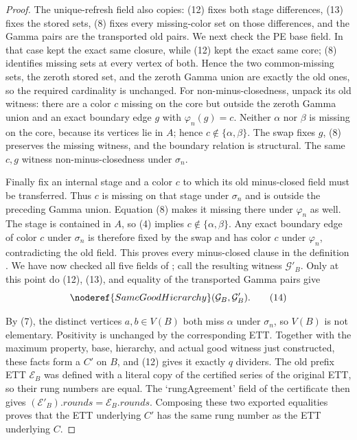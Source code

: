 \begin{proof}
The unique-refresh field also copies: (12) fixes both stage differences,
(13) fixes the stored sets, (8) fixes every missing-color set on those
differences, and the Gamma pairs are the transported old pairs.  We next
check the PE base field.  In that case
 kept the exact same closure,
while (12) kept the exact same core; (8) identifies missing sets at every
vertex of both.  Hence
the two common-missing sets, the zeroth stored set, and the zeroth Gamma
union are exactly the old ones, so the required cardinality is unchanged.
For non-minus-closedness, unpack its old witness: there are a color $c$
missing on the core but outside the zeroth Gamma union and an exact
boundary edge $g$ with $\varphi_n(g)=c$.  Neither $\alpha$ nor $\beta$
is missing on the core, because its vertices lie in $A$; hence
$c\notin\{\alpha,\beta\}$.  The swap fixes $g$, (8) preserves the missing
witness, and the boundary relation is structural.  The same $c,g$ witness
non-minus-closedness under $\sigma_n$.

Finally fix an internal stage and a color $c$ to which its old
minus-closed field must be transferred.  Thus $c$ is missing on that
stage under $\sigma_n$ and is outside the preceding Gamma union.
Equation (8) makes it missing there under $\varphi_n$ as well.  The stage
is contained in $A$, so (4) implies
$c\notin\{\alpha,\beta\}$.  Any exact boundary edge of color $c$ under
$\sigma_n$ is therefore fixed by the swap and has color $c$ under
$\varphi_n$, contradicting the old field.  This proves every
minus-closed clause in the definition
.  We have now checked all five fields of
; call the resulting witness $\mathcal G'_B$.
Only at this point do (12), (13), and equality of the transported Gamma
pairs give
\[
       \noderef{SameGoodHierarchy}(\mathcal G_B,\mathcal G'_B). \tag{14}
\]

By (7), the distinct vertices $a,b\in V(B)$ both miss $\alpha$ under
$\sigma_n$, so $V(B)$ is not elementary.  Positivity is unchanged by the
corresponding ETT.  Together with the maximum property, base, hierarchy,
and actual good witness just constructed, these facts form a
 $C'$ on $B$, and (12) gives it exactly
$q$ dividers.  The old prefix ETT $\mathcal E_B$ was defined with a
literal copy of the certified series of the original ETT, so their rung
numbers are equal.  The `rungAgreement' field of the
 certificate then gives
$(\mathcal E'_B).\mathit{rounds}=\mathcal E_B.\mathit{rounds}$.
Composing these two exported equalities proves that the ETT underlying
$C'$ has the same rung number as the ETT underlying $C$.


\end{proof}
